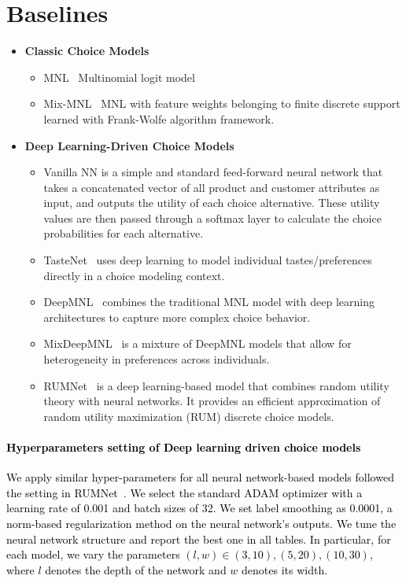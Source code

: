\documentclass{article} %
\begin{document}
\section{Baselines} 
\label{appendix:baselines}
\begin{itemize}
    \item \textbf{Classic Choice Models}
    \begin{itemize}
        \item MNL~\citep{mcfadden1981econometric}  Multinomial logit model 
        \item Mix-MNL~\citep{jagabathula2020conditional} MNL with feature weights belonging to finite discrete support learned with Frank-Wolfe algorithm framework.
    \end{itemize}
    \item \textbf{Deep Learning-Driven Choice Models}
    \begin{itemize}
       \item Vanilla NN is a simple and standard feed-forward neural network that takes a concatenated vector of all product and customer attributes as input, and outputs the utility of each choice alternative. These utility values are then passed through a softmax layer to calculate the choice probabilities for each alternative.
       \item TasteNet~\citep{han2020neural} uses deep learning to model individual tastes/preferences directly in a choice modeling context.
        \item DeepMNL~\citep{wang2020deep} combines the traditional MNL model with deep learning architectures to capture more complex choice behavior.
        \item MixDeepMNL~\citep{jagabathula2020conditional} is a mixture of DeepMNL models that allow for heterogeneity in preferences across individuals.
        \item RUMNet~\citep{aouad2022representing} is a deep learning-based model that combines random utility theory with neural networks. It provides an efficient approximation of random utility maximization (RUM) discrete choice models.
    \end{itemize}
\end{itemize}

\paragraph{\textcolor{black}{Hyperparameters setting of Deep learning driven choice models}} 
\textcolor{black}{We apply similar hyper-parameters for all neural network-based models followed the setting in RUMNet~\citep{aouad2022representing}. We select the standard ADAM optimizer with a learning rate of 0.001 and batch sizes of 32. We set label smoothing as 0.0001, a norm-based regularization method on the neural network’s outputs. We tune the neural network structure and report the best one in all tables. In particular, for each model, we vary the parameters $(l, w) \in {(3, 10), (5, 20), (10, 30)}$, where $l$ denotes the depth of the network and $w$ denotes its width.}
\end{document}
